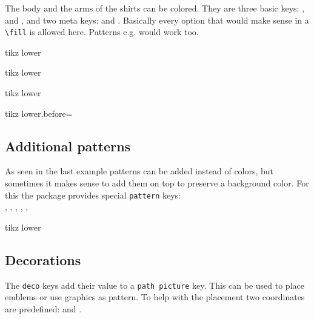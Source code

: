  The body and the arms of the shirts can be colored. They are three basic keys: ,  and , and two meta keys:  and .
 Basically every option that would make sense in a \lstinline|\fill|  is allowed here.
 Patterns e.g. would work too.
 \begin{tcblisting}{tikz lower}
  \bear
  \bearwear
    [v-neckline,
     leftarm=red,
     rightarm=green,
     body=blue]
 \end{tcblisting}
 \begin{tcblisting}{tikz lower}
  \bear
  \bearwear[arms=green]
 \end{tcblisting}
 \begin{tcblisting}{tikz lower}
  \bear
  \bearwear
    [shirt=
      {shade,
       top color=blue,
       bottom color=red}]
 \end{tcblisting}

 \begin{tcblisting}{tikz lower,before=\parindent0pt\nopagebreak}
   \bear
   \bearwear
     [v-neckline,
      shirt  =
        {pattern=
          horizontal lines light blue}]
 \end{tcblisting}

 \subsection{Additional patterns}

 As seen in the last example patterns can be added instead of colors, but sometimes it makes sense to
 add them on top to preserve a background color. For this the package provides special \texttt{pattern} keys:\\
 , , ,
 , ,

 \begin{tcblisting}{tikz lower}
  \bear
  \bearwear
     [v-neckline,
      shirt=red,
      body pattern =
       {pattern=
         {Stars[points=6,
          radius=0.5mm,distance=1.5mm]},
        pattern color=yellow}]
 \end{tcblisting}

 \subsection{Decorations}

 The \lstinline|deco| keys add their value to a \texttt{path picture} key. This can be used to place emblems or use graphics as pattern. To help with the placement two coordinates are
 predefined:  and .

